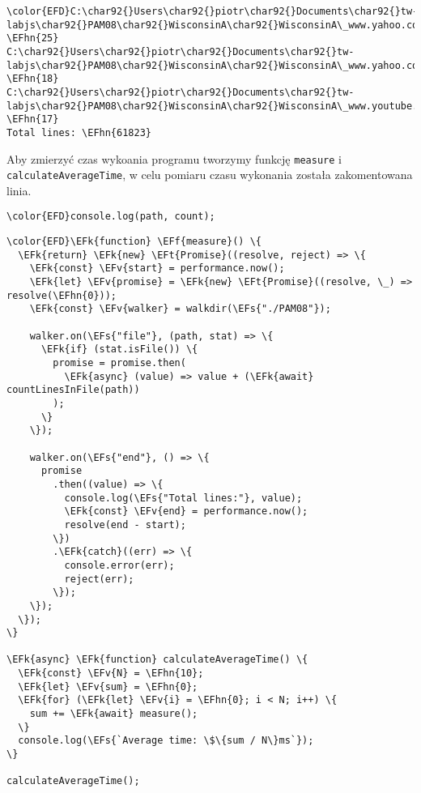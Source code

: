 \documentclass[11pt]{article}
\newcommand{\EFs}[1]{\textcolor{EFs}{#1}} %
\newcommand{\EFk}[1]{\textcolor{EFk}{#1}} %
\newcommand{\EFf}[1]{\textcolor{EFf}{#1}} %
\newcommand{\EFv}[1]{\textcolor{EFv}{#1}} %
\newcommand{\EFt}[1]{\textcolor{EFt}{#1}} %
\newcommand{\EFhn}[1]{\textcolor{EFhn}{#1}} %
\begin{document}
\begin{Code}
\begin{Verbatim}
\color{EFD}C:\char92{}Users\char92{}piotr\char92{}Documents\char92{}tw-labjs\char92{}PAM08\char92{}WisconsinA\char92{}WisconsinA\_www.yahoo.co.jp.html \EFhn{25}
C:\char92{}Users\char92{}piotr\char92{}Documents\char92{}tw-labjs\char92{}PAM08\char92{}WisconsinA\char92{}WisconsinA\_www.yahoo.com.html \EFhn{18}
C:\char92{}Users\char92{}piotr\char92{}Documents\char92{}tw-labjs\char92{}PAM08\char92{}WisconsinA\char92{}WisconsinA\_www.youtube.com.html \EFhn{17}
Total lines: \EFhn{61823}
\end{Verbatim}
\end{Code}

Aby zmierzyć czas wykoania programu tworzymy funkcję \texttt{measure} i
\texttt{calculateAverageTime}, w celu pomiaru czasu wykonania została zakomentowana linia.

\begin{Code}
\begin{Verbatim}
\color{EFD}console.log(path, count);
\end{Verbatim}
\end{Code}

\begin{Code}
\begin{Verbatim}
\color{EFD}\EFk{function} \EFf{measure}() \{
  \EFk{return} \EFk{new} \EFt{Promise}((resolve, reject) => \{
    \EFk{const} \EFv{start} = performance.now();
    \EFk{let} \EFv{promise} = \EFk{new} \EFt{Promise}((resolve, \_) => resolve(\EFhn{0}));
    \EFk{const} \EFv{walker} = walkdir(\EFs{"./PAM08"});

    walker.on(\EFs{"file"}, (path, stat) => \{
      \EFk{if} (stat.isFile()) \{
        promise = promise.then(
          \EFk{async} (value) => value + (\EFk{await} countLinesInFile(path))
        );
      \}
    \});

    walker.on(\EFs{"end"}, () => \{
      promise
        .then((value) => \{
          console.log(\EFs{"Total lines:"}, value);
          \EFk{const} \EFv{end} = performance.now();
          resolve(end - start);
        \})
        .\EFk{catch}((err) => \{
          console.error(err);
          reject(err);
        \});
    \});
  \});
\}

\EFk{async} \EFk{function} calculateAverageTime() \{
  \EFk{const} \EFv{N} = \EFhn{10};
  \EFk{let} \EFv{sum} = \EFhn{0};
  \EFk{for} (\EFk{let} \EFv{i} = \EFhn{0}; i < N; i++) \{
    sum += \EFk{await} measure();
  \}
  console.log(\EFs{`Average time: \$\{sum / N\}ms`});
\}

calculateAverageTime();
\end{Verbatim}
\end{Code}
\end{document}
